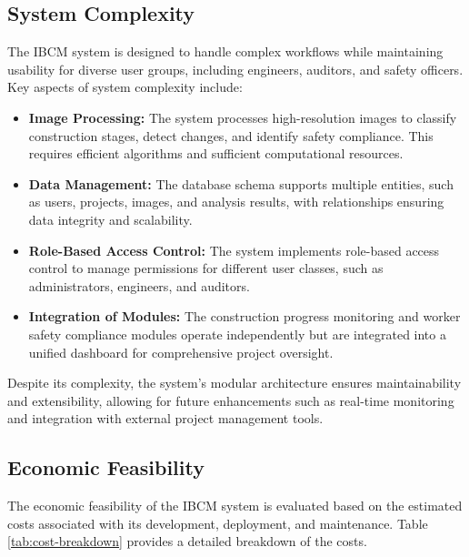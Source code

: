 \documentclass[12pt,a4paper]{report}
\begin{document}
\subsection{System Complexity}
The IBCM system is designed to handle complex workflows while maintaining usability for diverse user groups, including engineers, auditors, and safety officers. Key aspects of system complexity include:
\begin{itemize}
    \item \textbf{Image Processing:} The system processes high-resolution images to classify construction stages, detect changes, and identify safety compliance. This requires efficient algorithms and sufficient computational resources.
    \item \textbf{Data Management:} The database schema supports multiple entities, such as users, projects, images, and analysis results, with relationships ensuring data integrity and scalability.
    \item \textbf{Role-Based Access Control:} The system implements role-based access control to manage permissions for different user classes, such as administrators, engineers, and auditors.
    \item \textbf{Integration of Modules:} The construction progress monitoring and worker safety compliance modules operate independently but are integrated into a unified dashboard for comprehensive project oversight.
\end{itemize}
Despite its complexity, the system's modular architecture ensures maintainability and extensibility, allowing for future enhancements such as real-time monitoring and integration with external project management tools.

\subsection{Economic Feasibility}
The economic feasibility of the IBCM system is evaluated based on the estimated costs associated with its development, deployment, and maintenance. Table \ref{tab:cost-breakdown} provides a detailed breakdown of the costs.
\end{document}
